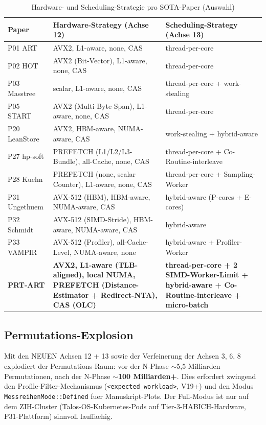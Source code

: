 \begin{table}[h!]
\centering
\caption{Hardware- und Scheduling-Strategie pro SOTA-Paper (Auswahl)}\label{tab:hw-sched-papers}
\small
\begin{tabular}{|l|l|l|}
\hline
\textbf{Paper} & \textbf{Hardware-Strategy (Achse 12)} & \textbf{Scheduling-Strategy (Achse 13)} \\
\hline
P01 ART          & AVX2, L1-aware, none, CAS                     & thread-per-core \\
P02 HOT          & AVX2 (Bit-Vector), L1-aware, none, CAS        & thread-per-core \\
P03 Masstree     & scalar, L1-aware, none, CAS                   & thread-per-core + work-stealing \\
P05 START        & AVX2 (Multi-Byte-Span), L1-aware, none, CAS   & thread-per-core \\
P20 LeanStore    & AVX2, HBM-aware, NUMA-aware, CAS              & work-stealing + hybrid-aware \\
P27 hp-soft      & PREFETCH (L1/L2/L3-Bundle), all-Cache, none, CAS & thread-per-core + Co-Routine-interleave \\
P28 Kuehn        & PREFETCH (none, scalar Counter), L1-aware, none, CAS & thread-per-core + Sampling-Worker \\
P31 Ungethuem    & AVX-512 (HBM), HBM-aware, NUMA-aware, CAS     & hybrid-aware (P-cores + E-cores) \\
P32 Schmidt      & AVX-512 (SIMD-Stride), HBM-aware, NUMA-aware, CAS & hybrid-aware \\
P33 VAMPIR       & AVX-512 (Profiler), all-Cache-Level, NUMA-aware, none & hybrid-aware + Profiler-Worker \\
\hline
\textbf{PRT-ART} & \textbf{AVX2, L1-aware (TLB-aligned), local NUMA, PREFETCH (Distance-Estimator + Redirect-NTA), CAS (OLC)} & \textbf{thread-per-core + 2 SIMD-Worker-Limit + hybrid-aware + Co-Routine-interleave + micro-batch} \\
\hline
\end{tabular}
\end{table}

\subsection{Permutations-Explosion}

Mit den NEUEN Achsen 12 + 13 sowie der Verfeinerung der Achsen 3, 6, 8
explodiert der Permutations-Raum: vor der N-Phase $\sim$5,5 Milliarden
Permutationen, nach der N-Phase \textbf{$\sim$100 Milliarden+}. Dies
erfordert zwingend den Profile-Filter-Mechanismus
(\texttt{<expected\_workload>}, V19+) und den Modus
\texttt{MessreihenMode::Defined} fuer Manuskript-Plots. Der
Full-Modus ist nur auf dem ZIH-Cluster (Talos-OS-Kubernetes-Pods auf
Tier-3-HABICH-Hardware, P31-Plattform) sinnvoll lauffaehig.

